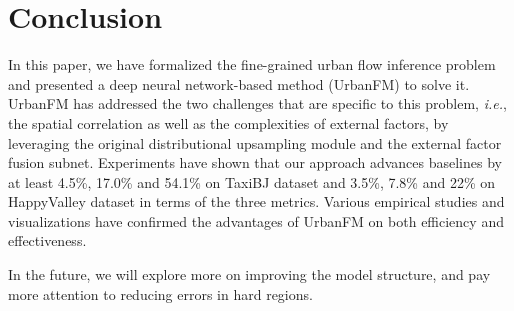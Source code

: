 \section{Conclusion}
In this paper, we have formalized the fine-grained urban flow inference problem and presented a deep neural network-based method (UrbanFM) to solve it. UrbanFM has addressed the two challenges that are specific to this problem, \emph{i.e.}, the spatial correlation as well as the complexities of external factors, by leveraging the original distributional upsampling module and the external factor fusion subnet. Experiments have shown that our approach advances baselines by at least 4.5\%, 17.0\% and 54.1\% on TaxiBJ dataset and 3.5\%, 7.8\% and 22\% on HappyValley dataset in terms of the three metrics. Various empirical studies and visualizations have confirmed the advantages of UrbanFM on both efficiency and effectiveness.

In the future, we will explore more on improving the model structure, and pay more attention to reducing errors in hard regions.
\appendix
